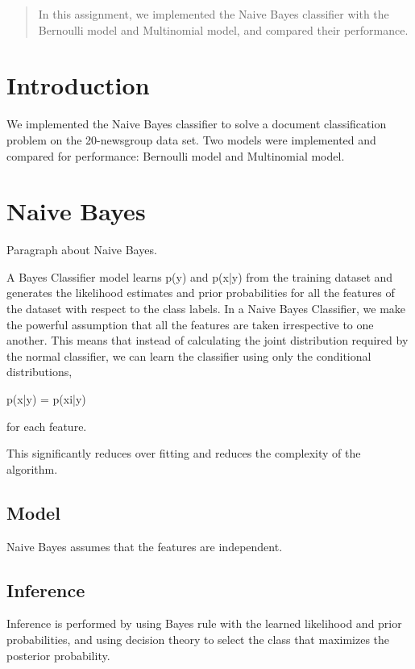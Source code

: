\documentclass[12pt]{article}
\begin{document}
\maketitle

\begin{abstract}
In this assignment, we implemented the Naive Bayes classifier with the Bernoulli model and Multinomial model, and compared their performance.
\end{abstract}

\section{Introduction}
We implemented the Naive Bayes classifier to solve a document classification problem on the 20-newsgroup data set. Two models were implemented and compared for performance: Bernoulli model and Multinomial model.

\section{Naive Bayes}
Paragraph about Naive Bayes.

A Bayes Classifier model learns p(y) and p(x|y) from the training dataset and generates the likelihood estimates and prior probabilities for all the features of the dataset with respect to the class labels. In a Naive Bayes Classifier, we make the powerful assumption that all the features are taken irrespective to one another. This means that instead of calculating the joint distribution required by the normal classifier, we can learn the classifier using only the conditional distributions, 

p(x|y) = p(xi|y) 

for each feature.

This significantly reduces over fitting and reduces the complexity of the algorithm.

\subsection{Model}
Naive Bayes assumes that the features are independent.

\subsection{Inference}
Inference is performed by using Bayes rule with the learned likelihood and prior probabilities, and using decision theory to select the class that maximizes the posterior probability.
\end{document}
